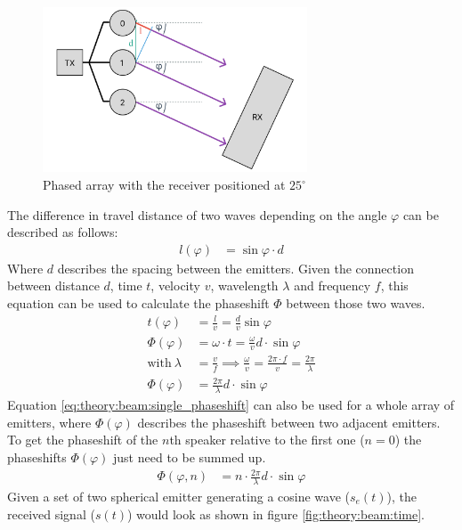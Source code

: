\begin{figure}
  \centering
  \includegraphics[width=0.7\textwidth]{src/assets/pictures/theory/angle_array.png}
  \caption{Phased array with the receiver positioned at $25^\circ$}\label{fig:theory:beam:array_angle}
\end{figure}
\p
The difference in travel distance of two waves depending on the angle \(\varphi\) can be described as follows:
%
\begin{align}
  l(\varphi) &= \sin \varphi \cdot d
\end{align}
%
Where \(d\) describes the spacing between the emitters.\newpage
%
\noindent Given the connection between distance $d$, time $t$, velocity $v$, wavelength $\lambda$ and frequency $f$, this equation can be used to calculate the phaseshift $\Phi$ between those two waves.\cite{elert_speed_2021}\cite{cassidy_understanding_2002}
%
\begin{align}
  t(\varphi)     &= \frac{l}{v} = \frac{d}{v} \sin \varphi \\[1em]
  \Phi(\varphi)  &= \omega \cdot t = \frac{\omega}{v} d \cdot \sin \varphi \\[1em]
  \mathrm{with~} \lambda &= \frac{v}{f} \implies \frac{\omega}{v} = \frac{2\pi \cdot f}{v} = \frac{2\pi}{\lambda} \\[1em]
  \Phi(\varphi)  &= \frac{2\pi}{\lambda} d \cdot \sin \varphi \label{eq:theory:beam:single_phaseshift}
\end{align}
%
Equation \ref{eq:theory:beam:single_phaseshift} can also be used for a whole array of emitters, where $\Phi(\varphi)$ describes the phaseshift between two adjacent emitters. To get the phaseshift of the $n$th speaker relative to the first one ($n=0$) the phaseshifts $\Phi(\varphi)$ just need to be summed up.
%
\begin{align}
  \Phi(\varphi, n) &= n \cdot \frac{2\pi}{\lambda} d \cdot \sin \varphi
\end{align}
%
Given a set of two spherical emitter generating a cosine wave (\(s_e(t)\)), the received signal (\(s(t)\)) would look as shown in figure \ref{fig:theory:beam:time}.
